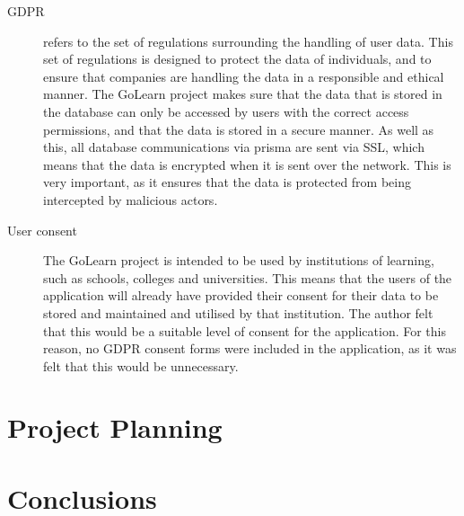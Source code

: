 \documentclass[11pt, a4paper,twoside]{report}
\theoremstyle{plain} %
\theoremstyle{definition} %
\numberwithin{equation}{chapter}
\begin{document}
\begin{description}
    \item[GDPR\cite{gdpr}] {
         refers to the set of regulations surrounding the handling of user
        data. This set of regulations is designed to protect the data of
        individuals, and to ensure that companies are handling the data in a
        responsible and ethical manner. The GoLearn project makes sure that
        the data that is stored in the database can only be accessed by users
        with the correct access permissions, and that the data is stored in a
        secure manner. As well as this, all database communications via prisma
        are sent via SSL, which means that the data is encrypted when it is
        sent over the network. This is very important, as it ensures that the
        data is protected from being intercepted by malicious actors.
        }

    \item[User consent] {
        The GoLearn project is intended to be used by institutions of learning,
        such as schools, colleges and universities. This means that the users
        of the application will already have provided their consent for their
        data to be stored and maintained and utilised by that institution. The
        author felt that this would be a suitable level of consent for the
        application. For this reason, no GDPR consent forms were included in
        the application, as it was felt that this would be unnecessary.
        }
\end{description}

\chapter{Project Planning}\label{ch:projectplanning}


\chapter{Conclusions}\label{ch:conclusion}




\end{document}
